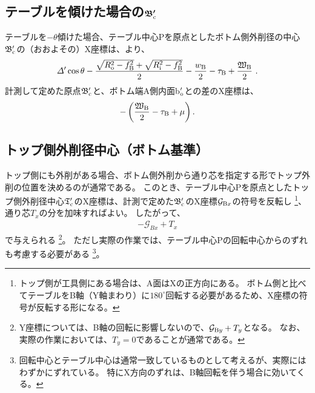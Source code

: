 \subsection[テーブルを傾けた場合の$\mathfrak B_\text c'$]
           {テーブルを傾けた場合の$\boldsymbol{\mathfrak B_\text c'}$}
テーブルを$-\theta$傾けた場合、テーブル中心Pを原点としたボトム側外削径の中心$\mathfrak B_\text c'$の（おおよその）X座標は、より、
\begin{align*}
  \varDelta'\cos\theta-\frac{\sqrt{R_\text o^2-f_\text B^2}+\sqrt{R_\text i^2-f_\text B^2}}2
  -\frac{w_\text B}2-\tau_\text B+\frac{\mathfrak W_\text B}2\ .
\end{align*}
計測して定めた原点$\mathfrak B_\text c'$と、ボトム端A側内面b$_\text o'$との差のX座標は、
\begin{align*}
  -\left(\frac{\mathfrak W_\text B}2-\tau_\text B+\mu\right).
\end{align*}


\subsection{トップ側外削径中心（ボトム基準）}
トップ側にも外削がある場合、ボトム側外削から通り芯を指定する形でトップ外削の位置を決めるのが通常である。
このとき、テーブル中心Pを原点としたトップ側外削径中心$\mathfrak T_\text c'$のX座標は、計測で定めた$\mathfrak B_\text c'$のX座標$\mathcal G_{\text Bx}$の符号を反転し
\footnote{トップ側が工具側にある場合は、A面はXの正方向にある。
ボトム側と比べてテーブルをB軸（Y軸まわり）に$180^\circ$回転する必要があるため、X座標の符号が反転する形になる。}、
通り芯$T_x$の分を加味すればよい。
したがって、
\begin{align*}
  -\mathcal G_{Bx}+T_x
\end{align*}
で与えられる
\footnote{Y座標については、B軸の回転に影響しないので、$\mathcal G_{\text By}+T_y$となる。
なお、実際の作業においては、$T_y = 0$であることが通常である。}。
ただし実際の作業では、テーブル中心Pの回転中心からのずれも考慮する必要がある
\footnote{回転中心とテーブル中心は通常一致しているものとして考えるが、実際にはわずかにずれている。
特にX方向のずれは、B軸回転を伴う場合に効いてくる。}。



